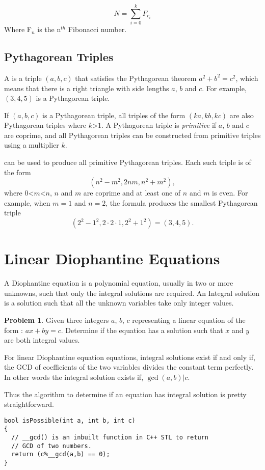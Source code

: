 \documentclass[twoside,12pt,a4paper,english]{book}
\theoremstyle{definition}
\theoremstyle{problemstyle}
\newtheorem*{problem}{Problem} %
\theoremstyle{problemstyle}
\theoremstyle{problemstyle}
\begin{document}
$$N=\sum _{{i=0}}^{k}F_{{c_{i}}}$$
Where F$_{n}$ is the n$^{th}$ Fibonacci number.

\subsection{Pythagorean Triples}
A  is a triple $(a,b,c)$
that satisfies the Pythagorean theorem
$a^2+b^2=c^2$, which means that there is a right triangle
with side lengths $a$, $b$ and $c$.
For example, $(3,4,5)$ is a Pythagorean triple.

If $(a,b,c)$ is a Pythagorean triple,
all triples of the form $(ka,kb,kc)$
are also Pythagorean triples where $k$>$1$.
A Pythagorean triple is \emph{primitive} if
$a$, $b$ and $c$ are coprime,
and all Pythagorean triples can be constructed
from primitive triples using a multiplier $k$.

 can be used to produce
all primitive Pythagorean triples.
Each such triple is of the form
\[(n^2-m^2,2nm,n^2+m^2),\]
where $0$<$m$<$n$, $n$ and $m$ are coprime
and at least one of $n$ and $m$ is even.
For example, when $m=1$ and $n=2$, the formula
produces the smallest Pythagorean triple
\[(2^2-1^2,2\cdot2\cdot1,2^2+1^2)=(3,4,5).\]

\section{Linear Diophantine Equations}
A Diophantine equation is a polynomial equation, usually in two or more unknowns, such that only the integral solutions are required. An Integral solution is a solution such that all the unknown variables take only integer values.
\begin{problem}
  Given three integers $a$, $b$, $c$ representing a linear equation of the form : $ax + by = c$. Determine if the equation has a solution such that $x$ and $y$ are both integral values.
\end{problem}
\begin{tcolorbox}[title=Solution]
\hfil\break
For linear Diophantine equation equations, integral solutions exist if and only if, the GCD of coefficients of the two variables divides the constant term perfectly. In other words the integral solution exists if, $\gcd(a,b) | c$.

Thus the algorithm to determine if an equation has integral solution is pretty straightforward.
\begin{lstlisting}
bool isPossible(int a, int b, int c)
{
  // __gcd() is an inbuilt function in C++ STL to return
  // GCD of two numbers.
  return (c%__gcd(a,b) == 0);
}
\end{lstlisting}
\end{tcolorbox}
\newpage
\end{document}
